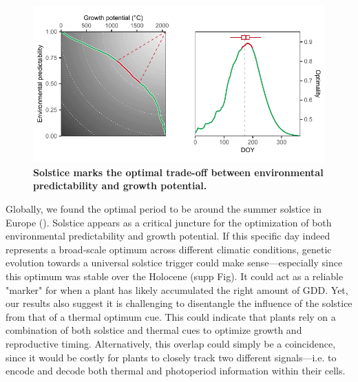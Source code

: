 \documentclass[11pt,letter]{article}
\begin{document}
\begin{figure}[h]
\centering
\includegraphics{global_optimality.pdf}
\vspace*{-0.7cm}
\caption{\textbf{Solstice marks the optimal trade-off between environmental predictability and growth potential.}}
\label{fig:globaloptimality}
\end{figure}

Globally, we found the optimal period to be around the summer solstice in Europe (). Solstice appears as a critical juncture for the optimization of both environmental predictability and growth potential.
If this specific day indeed represents a broad-scale optimum across different climatic conditions, genetic evolution towards a universal solstice trigger could make sense---especially since this optimum was stable over the Holocene (supp Fig). 
It could act as a reliable "marker" for when a plant has likely accumulated the right amount of GDD.
Yet, our results also suggest it is challenging to disentangle the influence of the solstice from that of a thermal optimum cue.
This could indicate that plants rely on a combination of both solstice and thermal cues to optimize growth and reproductive timing. 
Alternatively, this overlap could simply be a coincidence, since it would be costly for plants to closely track two different signals---i.e. to encode and decode both thermal and photoperiod information within their cells. 
\end{document}
